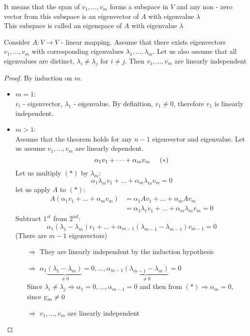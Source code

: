 \begin{remark}
It means that the span of $v_1,\dots,v_m$ forms a subspace in $V$ and any non - zero vector from this subspace is an eigenvector of $A$ with eigenvalue $\lambda$\\

This subspace is called an eigenspace of $A$ with eigenvalue $\lambda$	
\end{remark}

\begin{theorem}
Consider $A:V\to V$ - linear mapping. Assume that there exists eigenvectors $v_1,\dots,v_m$ with corresponding eigenvalues $\lambda_1,\dots,\lambda_m$. Let us also assume that all eigenvalues are distinct, $\lambda_i \not=\lambda_j$ for $i\not= j$. Then $v_1,\dots,v_m$ are linearly independent
\end{theorem}

\begin{proof}
By induction on $m$.
\begin{itemize}
\item $m = 1$: \\
$v_i$ - eigenvector, $\lambda_1$ - eigenvalue. By definition, $v_1\not=0$, therefore $v_1$ is linearly independent. 

\item $m>1$:\\
Assume that the theorem holds for any $n-1$ eigenvector and eigenvalue. Let us assume $v_1,\dots,v_m$ are linearly dependent. 
\[
\alpha_1 v_1 + \dots + \alpha_m v_m\hspace{5mm}(\ast)
\]
Let us multiply $(\ast)$ by $\lambda_m$:
\[
\alpha_1 \lambda_m v_1 + \dots + \alpha_m \lambda_m v_m = 0
\]
let us apply $A$ to $(\ast)$:
\begin{align*}
A(\alpha_1 v_1 + \dots + \alpha_m v_m) &= \alpha_1 A v_1 + \dots + \alpha_m A v_m\\
&= \alpha_1 \lambda_1 v_1 + \dots + \alpha_m\lambda_m v_m = 0
\end{align*}
Subtract $1^{st}$ from $2^{nd}$:
\[
\alpha_1(\lambda_1 - \lambda_m)v_1+\dots+\alpha_{m-1}(\lambda_{m-1} - \lambda_{m-1})v_{m-1} = 0
\]
(There are ${m-1}$ eigenvectors)
\begin{enumerate}
\item[$\Rightarrow$] They are linearly independent by the induction hypothesis
\item[$\Rightarrow$] $\alpha_1 \underbrace{(\lambda_1-\lambda_m)}_{\not=0} = 0, \dots,\alpha_{m-1} \underbrace{(\lambda_{m-1}-\lambda_m)}_{\not=0} = 0$\\

Since $\lambda_i\not=\lambda_j\Rightarrow \alpha_1=0,\dots,\alpha_{m-1} = 0$ and then from $(\ast)\Rightarrow\alpha_m = 0$, since $\underline{v}_m \not=0$
\item[$\Rightarrow$] $v_1,\dots,v_m$ are linearly independent 
\end{enumerate}
\end{itemize}
\end{proof}

